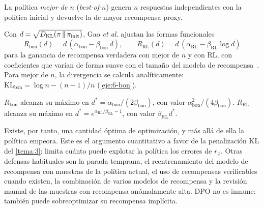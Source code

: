 \begin{definicion}[Mejor de $n$]\label{def:bon}
La política \emph{mejor de $n$} (\emph{best-of-$n$}) genera $n$ respuestas independientes con la política inicial y devuelve la de mayor recompensa proxy.
\end{definicion}

Con $d=\sqrt{D_{\mathrm{KL}}(\pi\,\|\,\pi_{\mathrm{init}})}$, Gao \emph{et al.} ajustan las formas funcionales
\[
R_{\mathrm{bon}}(d)=d\,(\alpha_{\mathrm{bon}}-\beta_{\mathrm{bon}}\,d),\qquad R_{\mathrm{RL}}(d)=d\,(\alpha_{\mathrm{RL}}-\beta_{\mathrm{RL}}\log d)
\]
para la ganancia de recompensa verdadera con mejor de $n$ y con RL, con coeficientes que varían de forma suave con el tamaño del modelo de recompensa~\cite{gao}. Para mejor de $n$, la divergencia se calcula analíticamente: $\mathrm{KL}_{\mathrm{bon}}=\log n-(n-1)/n$ (\cref{eje:6-bon}).

\begin{proposicion}\label{prop:gao}
$R_{\mathrm{bon}}$ alcanza su máximo en $d^{*}=\alpha_{\mathrm{bon}}/(2\beta_{\mathrm{bon}})$, con valor $\alpha_{\mathrm{bon}}^{2}/(4\beta_{\mathrm{bon}})$. $R_{\mathrm{RL}}$ alcanza su máximo en $d^{*}=e^{\alpha_{\mathrm{RL}}/\beta_{\mathrm{RL}}-1}$, con valor $\beta_{\mathrm{RL}}d^{*}$.
\end{proposicion}

Existe, por tanto, una cantidad óptima de optimización, y más allá de ella la política empeora. Este es el argumento cuantitativo a favor de la penalización KL del \cref{tema:3}: limita cuánto puede explotar la política los errores de $r_\phi$. Otras defensas habituales son la parada temprana, el reentrenamiento del modelo de recompensa con muestras de la política actual, el uso de recompensas verificables cuando existen, la combinación de varios modelos de recompensa y la revisión manual de las muestras con recompensa anómalamente alta. DPO no es inmune: también puede sobreoptimizar su recompensa implícita.

